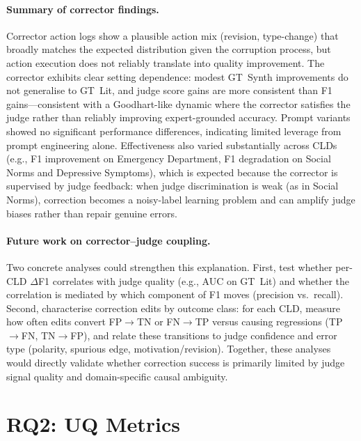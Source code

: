 \paragraph{Summary of corrector findings.}
Corrector action logs show a plausible action mix (revision, type-change) that broadly matches the expected distribution given the corruption process, but action execution does not reliably translate into quality improvement. The corrector exhibits clear setting dependence: modest GT~Synth improvements do not generalise to GT~Lit, and judge score gains are more consistent than F1 gains---consistent with a Goodhart-like dynamic where the corrector satisfies the judge rather than reliably improving expert-grounded accuracy. Prompt variants showed no significant performance differences, indicating limited leverage from prompt engineering alone. Effectiveness also varied substantially across CLDs (e.g., F1 improvement on Emergency Department, F1 degradation on Social Norms and Depressive Symptoms), which is expected because the corrector is supervised by judge feedback: when judge discrimination is weak (as in Social Norms), correction becomes a noisy-label learning problem and can amplify judge biases rather than repair genuine errors.

\paragraph{Future work on corrector--judge coupling.}
Two concrete analyses could strengthen this explanation. First, test whether per-CLD $\Delta$F1 correlates with judge quality (e.g., AUC on GT~Lit) and whether the correlation is mediated by which component of F1 moves (precision vs.\ recall). Second, characterise correction edits by outcome class: for each CLD, measure how often edits convert FP$\rightarrow$TN or FN$\rightarrow$TP versus causing regressions (TP$\rightarrow$FN, TN$\rightarrow$FP), and relate these transitions to judge confidence and error type (polarity, spurious edge, motivation/revision). Together, these analyses would directly validate whether correction success is primarily limited by judge signal quality and domain-specific causal ambiguity.

\section{RQ2: UQ Metrics}
\label{sec:discussion_rq2}

